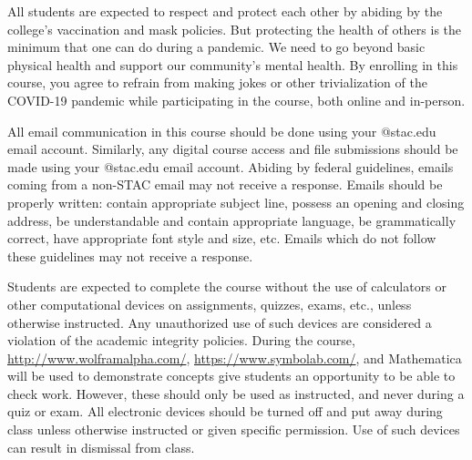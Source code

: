 \documentclass[11pt,letterpaper]{article}
\begin{document}
All students are expected to respect and protect each other by abiding by the college's vaccination and mask policies. But protecting the health of others is the minimum that one can do during a pandemic. We need to go beyond basic physical health and support our community's mental health. By enrolling in this course, you agree to refrain from making jokes or other trivialization of the COVID-19 pandemic while participating in the course, both online and in-person.
\sectionbreak



All email communication in this course should be done using your @stac.edu email account. Similarly, any digital course access and file submissions should be made using your @stac.edu email account. Abiding by federal guidelines, emails coming from a non-STAC email may not receive a response. Emails should be properly written: contain appropriate subject line, possess an opening and closing address, be understandable and contain appropriate language, be grammatically correct, have appropriate font style and size, etc. Emails which do not follow these guidelines may not receive a response.
\sectionbreak



Students are expected to complete the course without the use of calculators or other computational devices on assignments, quizzes, exams, etc., unless otherwise instructed. Any unauthorized use of such devices are considered a violation of the academic integrity policies. During the course, \href{http://www.wolframalpha.com/}{http://www.wolframalpha.com/}, \href{https://www.symbolab.com/}{https://www.symbolab.com/}, and Mathematica will be used to demonstrate concepts give students an opportunity to be able to check work. However, these should only be used as instructed, and never during a quiz or exam. All electronic devices should be turned off and put away during class unless otherwise instructed or given specific permission. Use of such devices can result in dismissal from class.
\sectionbreak
\end{document}
